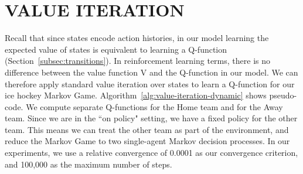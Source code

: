 \documentclass[]{article}
\begin{document}
\section{VALUE ITERATION}
\label{subsec:value-iteration-alg}

Recall that since states encode action histories, in our model learning the expected value of states is equivalent to learning a Q-function (Section~\ref{subsec:transitions}). In reinforcement learning terms, there is no difference between the value function V and the Q-function in our model. We can therefore apply standard value iteration over states \citep{bib:sutton} to learn a Q-function
 for our ice hockey Markov Game. Algorithm~\ref{alg:value-iteration-dynamic} shows pseudo-code. We compute separate Q-functions for the Home team and for the Away team. Since we are in the ``on policy" setting, we have a fixed policy for the other team. This means we can treat the other team as part of the environment, and reduce the Markov Game to two single-agent Markov decision processes. %
 In our experiments, we use a relative convergence of 0.0001 as our convergence criterion, and 100,000 as the maximum number of steps.%
%
%
%
%
%
\end{document}
